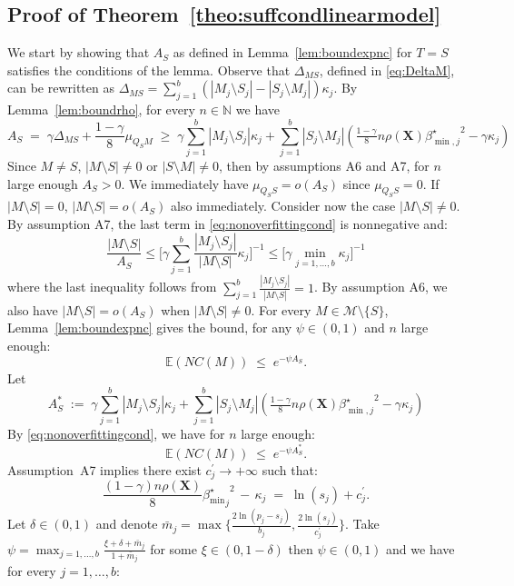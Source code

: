 \documentclass[aos]{imsart}
\theoremstyle{plain}
\newcommand{\E}{\mathbb{E}}
\newcommand{\N}{\mathbb{N}}
\newcommand{\bs}{\boldsymbol}
\begin{document}
\begin{supplement}
\subsection{Proof of Theorem~\ref{theo:suffcondlinearmodel}} We start by showing that $A_S$ as defined in Lemma~\ref{lem:boundexpnc} for $T=S$ satisfies the conditions of the lemma. Observe that $\Delta_{MS}$, defined in \eqref{eq:DeltaM}, can be rewritten as $\Delta_{MS}=\sum_{j=1}^b(|M_j\setminus S_j|-|S_j\setminus M_j|)\kappa_j$. By  Lemma~\ref{lem:boundrho}, for every $n\in \N$ we have 
\begin{equation}\label{eq:nonoverfittingcond}
   A_S\;=\; \gamma \Delta_{MS}+\frac{1-\gamma}{8}\mu_{Q_SM}\;\geq\; \gamma\sum_{j=1}^b|M_j \setminus S_j|\kappa_j + \sum_{j=1}^b |S_j\setminus M_j |\left(\tfrac{1-\gamma}{8} n \rho(\bs X) {\beta^{\star}_{\min,j}}^{2} - \gamma\kappa_j\right) 
\end{equation} 
Since $M\neq S$, $|M\setminus S|\neq0$ or $|S\setminus M|\neq0$, then by assumptions A6 and A7, for $n$ large enough $A_S>0$. We immediately have $\mu_{Q_S S}=o(A_S)$ since $\mu_{Q_S S}=0$. If $|M\setminus S|=0$, $|M\setminus S|=o(A_S)$ also immediately. Consider now the case $|M\setminus S|\neq 0$. By assumption A7, the last term in \eqref{eq:nonoverfittingcond} is nonnegative and:
$$\frac{|M\setminus S|}{A_S}\leq \bigg[ \gamma\sum_{j=1}^b\frac{|M_j \setminus S_j|}{|M\setminus S|}\kappa_j \bigg]^{-1} \leq \bigg[ \gamma\min_{j=1,\ldots,b}\kappa_j \bigg]^{-1} $$
where the last inequality follows from $\sum_{j=1}^b\frac{|M_j \setminus S_j|}{|M\setminus S|}=1$. By assumption A6, we also have $|M\setminus S|=o(A_S)$ when $|M\setminus S|\neq 0$. For every $M\in \mathcal M\setminus \{S\}$, Lemma~\ref{lem:boundexpnc} gives the bound, for any $\psi\in(0,1)$ and $n$ large enough:
$$
\E(NC(M))\;\leq\;e^{-\psi A_S}.
$$
Let 
$$A_S^*\;:=\;\gamma\sum_{j=1}^b|M_j \setminus S_j|\kappa_j + \sum_{j=1}^b |S_j\setminus M_j |\left(\tfrac{1-\gamma}{8} n \rho(\bs X) {\beta^{\star}_{\min,j}}^{2} - \gamma\kappa_j\right) $$
By \eqref{eq:nonoverfittingcond}, we have for $n$ large enough:
\begin{equation}\label{eq:boundexp}
    \E(NC(M))\;\leq\;e^{-\psi A_S^*}.
\end{equation}
Assumption~A7 implies there exist $c^{\prime}_j \to +\infty$ such that:
$$\frac{(1-\gamma) n\rho(\bs X)}{8}{{\beta_{\min}^{\star}}_j}^2 \,- \,\kappa_j \;=\; \ln(s_j) + c^{\prime}_{j}.$$
Let $\delta \in (0,1)$ and denote $\bar{m}_j=\max\big\{\frac{2\ln(p_j-s_j)}{b_{j}},\frac{2\ln(s_j)}{c^{\prime}_{j}}\big\}$. Take $\psi=\max_{j=1,\ldots,b}\frac{\xi + \delta + \bar{m}_j}{1+\bar{m}_j}$ for some $\xi \in(0, 1- \delta)$ then $\psi \in (0,1)$ and we have for every $j=1,\ldots,b$:

\end{supplement}
\end{document}

